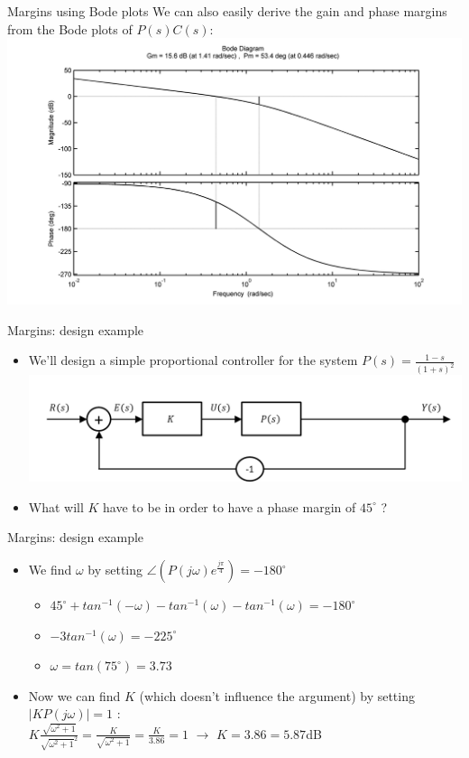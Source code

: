 \begin{frame}{Margins using Bode plots}
We can also easily derive the gain and phase margins from the Bode plots of $P(s)C(s)$:
\\ \includegraphics[width=1.1\linewidth]{Afbeelding22}
\end {frame}

\begin{frame}{Margins: design example}
\begin{itemize}
\item We’ll design a simple proportional controller for the system $P(s) = \frac{1-s}{(1+s)^2}$ 
\\ \includegraphics[width=0.8\linewidth]{Afbeelding19}
\item What will $K$ have to be in order to have a phase margin of $45^{\circ}$ ?
\end{itemize}
\end {frame}

\begin{frame}{Margins: design example}
\begin{itemize}
\item We find $\omega$ by setting $\angle(P(j\omega)e^{\frac{j\pi}{4}})= -180^{\circ}$
\begin{itemize}
\item $45^{\circ} + tan^{-1}(-\omega)-tan^{-1}(\omega)-tan^{-1}(\omega) = -180^{\circ}$
\item $-3tan^{-1}(\omega)=-225^{\circ}$
\item $\omega = tan(75^{\circ})=3.73$
\end{itemize}
\item Now we can find $K$ (which doesn't influence the argument) by setting $|KP(j\omega)|=1$ :
\\ $K\frac{\sqrt{\omega^2+1}}{\sqrt{\omega^2+1}^2} = \frac{K}{\sqrt{\omega^2+1}} = \frac{K}{3.86} = 1$ $\rightarrow$ $K=3.86=5.87$dB
\end{itemize}
\end {frame}

